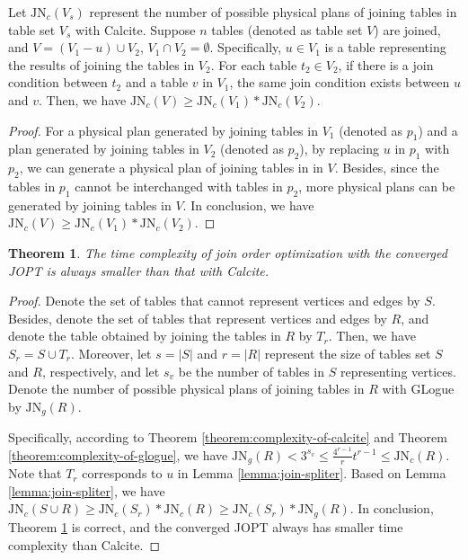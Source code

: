 \documentclass[sigconf, nonacm]{acmart}
\newtheorem{theorem}{Theorem}
\begin{document}
\begin{lemma}
    \label{lemma:join-spliter}
    Let $\text{JN}_c(V_s)$ represent the number of possible physical plans of joining tables in table set $V_s$ with Calcite.
    Suppose $n$ tables (denoted as table set $V$) are joined, and $V = (V_1 - u) \cup V_2$, $V_1 \cap V_2 = \emptyset$.
    Specifically, $u \in V_1$ is a table representing the results of joining the tables in $V_2$.
    For each table $t_2 \in V_2$, if there is a join condition between $t_2$ and a table $v$ in $V_1$, the same join condition exists between $u$ and $v$.
    Then, we have $\text{JN}_c(V) \geq \text{JN}_c(V_1) * \text{JN}_c(V_2)$.
\end{lemma}
\begin{proof}
    For a physical plan generated by joining tables in $V_1$ (denoted as $p_1$) and a plan generated by joining tables in $V_2$ (denoted as $p_2$), by replacing $u$ in $p_1$ with $p_2$, we can generate a physical plan of joining tables in in $V$.
    Besides, since the tables in $p_1$ cannot be interchanged with tables in $p_2$, more physical plans can be generated by joining tables in $V$.
    In conclusion, we have $\text{JN}_c(V) \geq \text{JN}_c(V_1) * \text{JN}_c(V_2)$.
\end{proof}

\begin{theorem}
    \label{theorem:complexity-of-converged-jopt}
    The time complexity of join order optimization with the converged JOPT is always smaller than that with Calcite.
\end{theorem}
\begin{proof}
    Denote the set of tables that cannot represent vertices and edges by $S$.
    Besides, denote the set of tables that represent vertices and edges by $R$, and denote the table obtained by joining the tables in $R$ by $T_r$.
    Then, we have $S_r = S \cup T_r$.
    Moreover, let $s = |S|$ and $r = |R|$ represent the size of tables set $S$ and $R$, respectively, and let $s_v$ be the number of tables in $S$ representing vertices.
    Denote the number of possible physical plans of joining tables in $R$ with GLogue by $\text{JN}_g(R)$.
    
    Specifically, according to Theorem \ref{theorem:complexity-of-calcite} and Theorem \ref{theorem:complexity-of-glogue}, we have $\text{JN}_g(R) < 3^{s_v} \leq \frac{4^{r-1}}{r}t^{r-1} \leq \text{JN}_c(R)$.
    Note that $T_r$ corresponds to $u$ in Lemma \ref{lemma:join-spliter}.
    Based on Lemma \ref{lemma:join-spliter}, we have $\text{JN}_c(S \cup R) \geq \text{JN}_c(S_r) * \text{JN}_c(R) \geq \text{JN}_c(S_r) * \text{JN}_g(R)$.
    In conclusion, Theorem \ref{theorem:complexity-of-converged-jopt} is correct, and the converged JOPT always has smaller time complexity than Calcite.
\end{proof}
\end{document}
